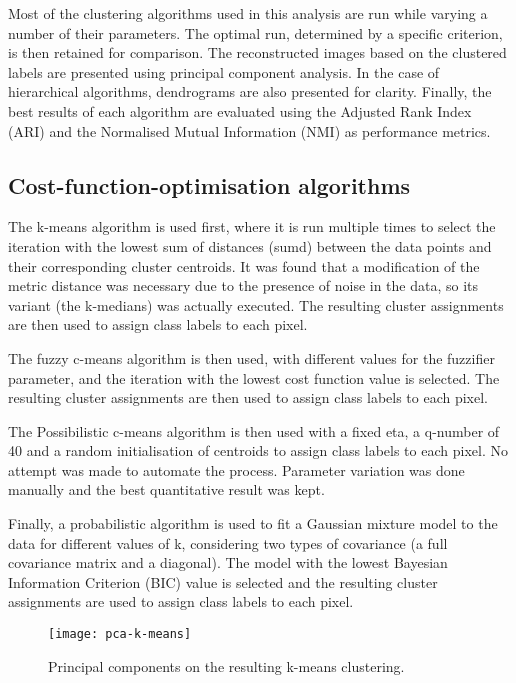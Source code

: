 \documentclass[
  course = {{DS12E Clustering Algorithms}},
  quartile = {{2}},
  assignment = ,
  name = {{Michael Darmanis ; Vasilios Venieris}},
  studentnumber = {{7115152200004 ; 7115152200017}},
  email = {{mdarm@di.uoa.gr ; vvenieris@di.uoa.gr}},
  firstexercise = 1
]{aga-homework}
\begin{document}
Most of the clustering algorithms used in this analysis are run while varying a number of their parameters. The optimal run, determined by a specific criterion, is then retained for comparison. The reconstructed images based on the clustered labels are presented using principal component analysis. In the case of hierarchical algorithms, dendrograms are also presented for clarity. Finally, the best results of each algorithm are evaluated using the Adjusted Rank Index (ARI) \cite{ard} and the Normalised Mutual Information (NMI) \cite{nmi} as performance metrics.

\subsection{Cost-function-optimisation algorithms}

The k-means algorithm is used first, where it is run multiple times to select the iteration with the lowest sum of distances (sumd) between the data points and their corresponding cluster centroids. It was found that a modification of the metric distance was necessary due to the presence of noise in the data, so its variant (the k-medians) was actually executed. The resulting cluster assignments are then used to assign class labels to each pixel.

The fuzzy c-means algorithm is then used, with different values for the fuzzifier parameter, and the iteration with the lowest cost function value is selected. The resulting cluster assignments are then used to assign class labels to each pixel.

The Possibilistic c-means algorithm is then used with a fixed eta, a q-number of 40 and a random initialisation of centroids to assign class labels to each pixel. No attempt was made to automate the process. Parameter variation was done manually and the best quantitative result was kept.

Finally, a probabilistic algorithm is used to fit a Gaussian mixture model to the data for different values of k, considering two types of covariance (a full covariance matrix and a diagonal). The model with the lowest Bayesian Information Criterion (BIC) \cite{bic} value is selected and the resulting cluster assignments are used to assign class labels to each pixel.

\begin{figure}[htbp!]
	\centering
    \texttt{[image: pca-k-means]}
    \caption{Principal components on the resulting k-means clustering.}
    \label{fig:k-means}
\end{figure}
\end{document}
